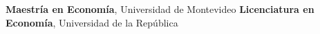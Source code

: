 %
%
%


\begin{scholarship}
					{\textbf{Maestría en Economía}, Universidad de Montevideo}
					{\textbf{Licenciatura en Economía}, Universidad de la República}

\end{scholarship}